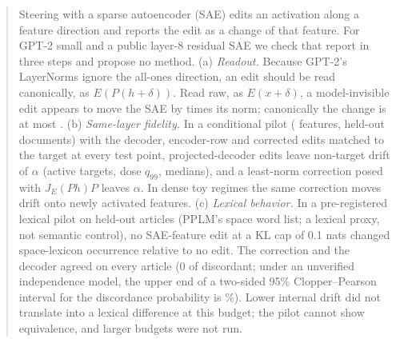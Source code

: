 \documentclass{article}
\theoremstyle{plain}
\theoremstyle{definition}
\theoremstyle{remark}
\begin{document}

\printAffiliationsAndNotice{}

\begin{abstract}
  Steering with a sparse autoencoder (SAE) edits an activation along a feature direction and
  reports the edit as a change of that feature. For GPT-2 small and a public layer-8 residual
  SAE we check that report in three steps and propose no method.
  (a) \emph{Readout.} Because GPT-2's LayerNorms ignore the all-ones direction, an edit
  should be read canonically, as $E(P(h+\delta))$. Read raw, as $E(x+\delta)$, a
  model-invisible edit appears to move the SAE by \ClRawMed{} times its norm; canonically the
  change is at most \ClCanonMax.
  (b) \emph{Same-layer fidelity.} In a conditional pilot (\PilotFeatures{} features,
  \PilotDocs{} held-out documents) with the decoder, encoder-row and corrected edits
  matched to the target at every test point, projected-decoder edits leave non-target
  drift of \PilotAllDec$\alpha$ (active targets, dose $q_{99}$, medians), and a
  least-norm correction posed with $J_E(Ph)P$ leaves \PilotAllLn$\alpha$. In dense toy
  regimes the same correction moves drift onto newly activated features.
  (c) \emph{Lexical behavior.} In a pre-registered lexical pilot on \SpDocs{} held-out
  articles (PPLM's space word list; a lexical proxy, not semantic control), no SAE-feature
  edit at a KL cap of 0.1 nats changed space-lexicon occurrence relative to no edit. The
  correction and the decoder agreed on every article (0 of \SpDocs{} discordant; under an
  unverified independence model, the upper end of a two-sided 95\% Clopper--Pearson
  interval for the discordance probability is \SpBoundTwo\%). Lower internal drift did not
  translate into a lexical difference at this budget; the pilot cannot show equivalence,
  and larger budgets were not run.
\end{abstract}
\end{document}

